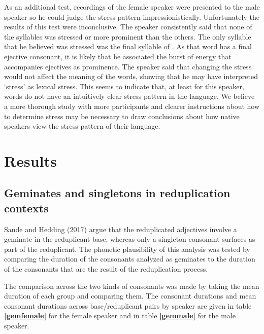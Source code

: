 \documentclass[12pt]{article}
\begin{document}
As an additional test, recordings of the female speaker were presented to the male speaker so he could judge the stress pattern impressionistically. Unfortunately the results of this test were inconclusive. The speaker consistently said that none of the syllables was stressed or more prominent than the others. The only syllable that he believed was stressed was the final syllable of \emph{}. As that word has a final ejective consonant, it is likely that he associated the burst of energy that accompanies ejectives as prominence. The speaker said that changing the stress would not affect the meaning of the words, showing that he may have interpreted `stress' as lexical stress. This seems to indicate that, at least for this speaker, words do not have an intuitively clear stress pattern in the language. We believe a more thorough study with more participants and clearer instructions about how to determine stress may be necessary to draw conclusions about how native speakers view the stress pattern of their language. 

\section{Results}
\subsection{Geminates and singletons in reduplication contexts}

Sande and Hedding (2017) argue that the reduplicated adjectives involve a geminate in the reduplicant-base, whereas only a singleton consonant surfaces as part of the reduplicant. The phonetic plausibility of this analysis was tested by comparing the duration of the consonants analyzed as geminates to the duration of the consonants that are the result of the reduplication process.

The comparison across the two kinds of consonants was made by taking the mean duration of each group and comparing them. The consonant durations and mean consonant durations across base/reduplicant pairs by speaker are given in table \textbf{\ref{gemfemale}} for the female speaker and in table \textbf{\ref{gemmale}} for the male speaker.
\end{document}
